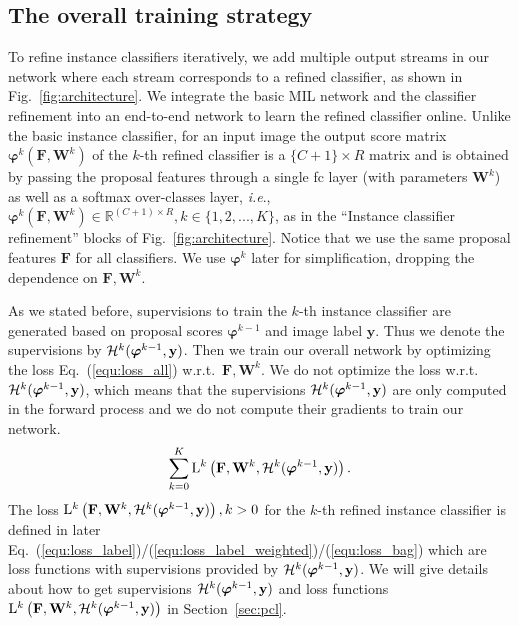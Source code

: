 \documentclass[10pt,journal,compsoc]{IEEEtran}
\def\ie{\emph{i.e}.} \def\Ie{\emph{I.e}.}
\def\wrt{w.r.t.} \def\dof{d.o.f.}
\begin{document}
\subsection{The overall training strategy}
\label{sec:ots}

To refine instance classifiers iteratively,
we add multiple output streams in our network where each stream corresponds to a refined classifier,
as shown in Fig.~\ref{fig:architecture}.
We integrate the basic MIL network and the classifier refinement into an end-to-end network to learn the refined classifier online.
Unlike the basic instance classifier,
for an input image the output score matrix $\bm{\varphi}^{k}(\mathbf{F}, \mathbf{W}^{k})$ of the $k$-th refined classifier is a $\{C+1\} \times R$ matrix and is obtained by passing the proposal features through a single fc layer (with parameters $\mathbf{W}^{k}$) as well as a softmax over-classes layer,
\ie, $\bm{\varphi}^{k}(\mathbf{F}, \mathbf{W}^{k}) \in \mathbb{R}^{(C+1) \times R}, k \in \{1, 2, ..., K\}$,
as in the ``Instance classifier refinement'' blocks of Fig.~\ref{fig:architecture}.
Notice that we use the same proposal features $\mathbf{F}$ for all classifiers.
We use $\bm{\varphi}^{k}$ later for simplification,
dropping the dependence on $\mathbf{F}, \mathbf{W}^{k}$.

As we stated before, supervisions to train the $k$-th instance classifier are generated based on proposal scores $\bm{\varphi}^{k-1}$ and image label $\mathbf{y}$.
Thus we denote the supervisions by ${\cal H}^{k}(\bm{\varphi}^{k-1}, \mathbf{y})$.
{Then we train our overall network by optimizing the loss Eq.~(\ref{equ:loss_all}) \wrt\ $\mathbf{F}, \mathbf{W}^{k}$.
We do not optimize the loss \wrt\ ${\cal H}^{k}(\bm{\varphi}^{k-1}, \mathbf{y})$,
which means that the supervisions ${\cal H}^{k}(\bm{\varphi}^{k-1}, \mathbf{y})$ are only computed in the forward process
and we do not compute their gradients to train our network.
}
\begin{equation}
\label{equ:loss_all}
\begin{aligned}
   \mathop{\sum} \limits_{k=0}^{K} \mathrm{L}^{k}\left(\mathbf{F}, \mathbf{W}^{k}, {\cal H}^{k}(\bm{\varphi}^{k-1}, \mathbf{y})\right).
\end{aligned}
\end{equation}
The loss $\mathrm{L}^{k}\left(\mathbf{F}, \mathbf{W}^{k}, {\cal H}^{k}(\bm{\varphi}^{k-1}, \mathbf{y})\right), k > 0$ for the $k$-th refined instance classifier is defined in later Eq.~(\ref{equ:loss_label})/(\ref{equ:loss_label_weighted})/(\ref{equ:loss_bag})
which are loss functions with supervisions provided by ${\cal H}^{k}(\bm{\varphi}^{k-1}, \mathbf{y})$.
We will give details about how to get supervisions ${\cal H}^{k}(\bm{\varphi}^{k-1}, \mathbf{y})$ and loss functions $\mathrm{L}^{k}\left(\mathbf{F}, \mathbf{W}^{k}, {\cal H}^{k}(\bm{\varphi}^{k-1}, \mathbf{y})\right)$ in Section~\ref{sec:pcl}.
\end{document}
